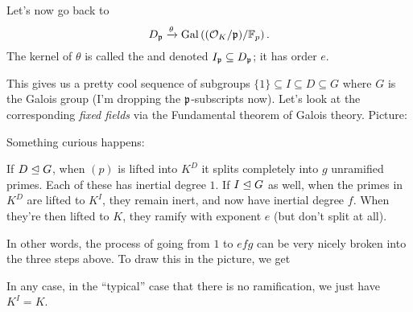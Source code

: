 Let's now go back to
\[ D_\mathfrak p \xrightarrow{\theta} \operatorname{Gal}\left( (\mathcal O_K/\mathfrak p)/\mathbb F_p \right). \]
The kernel of $\theta$ is called the 
and denoted $I_\mathfrak p \subseteq D_\mathfrak p$; it has order $e$.

This gives us a pretty cool sequence of subgroups
$\{1\} \subseteq I \subseteq D \subseteq G$
where $G$ is the Galois group (I'm dropping the $\mathfrak p$-subscripts now).
Let's look at the corresponding \emph{fixed fields} via the Fundamental theorem of Galois theory.
Picture:
\begin{center}
\end{center}

Something curious happens:
\begin{itemize}
	\ii If $D \trianglelefteq G$, when $(p)$ is lifted into $K^D$ it splits completely into $g$ unramified
	primes.
	Each of these has inertial degree $1$.
	\ii If $I \trianglelefteq G$ as well, when the primes in $K^D$ are lifted to $K^I$, they remain inert,
	and now have inertial degree $f$.
	\ii When they're then lifted to $K$, they ramify with exponent $e$ (but don't split at all).
\end{itemize}
In other words, the process of going from $1$ to $efg$
can be very nicely broken into the three steps above.
To draw this in the picture, we get
\begin{center}
\end{center}
In any case, in the ``typical'' case that there is no ramification,
we just have $K^I = K$.

